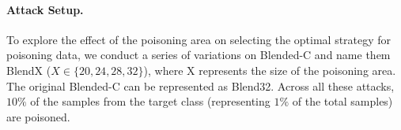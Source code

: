 \documentclass{article}
\begin{document}
\paragraph{Attack Setup.}
To explore the effect of the poisoning area on selecting the optimal strategy for poisoning data, we conduct a series of variations on Blended-C and name them BlendX (\(X\in\{20,24,28,32\}\)), where X represents the size of the poisoning area. The original Blended-C can be represented as Blend32. Across all these attacks, \(10\%\) of the samples from the target class (representing \(1\%\) of the total samples) are poisoned.
\begin{table}[h]
\end{table}
\end{document}
